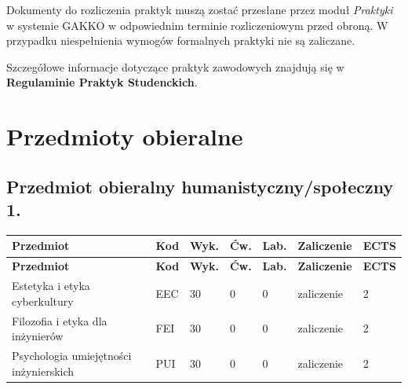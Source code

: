 \documentclass[12pt,a4paper]{article}
\newcommand{\thdrule}{\noalign{\global\setlength{\extrarowheight}{0pt}}}
\newcommand{\thdend}{\noalign{\global\setlength{\extrarowheight}{4pt}}}
\begin{document}
Dokumenty do rozliczenia praktyk muszą zostać przesłane przez moduł \textit{Praktyki} w systemie GAKKO w odpowiednim terminie rozliczeniowym przed obroną. W przypadku niespełnienia wymogów formalnych praktyki nie są zaliczane.

Szczegółowe informacje dotyczące praktyk zawodowych znajdują się w \textbf{Regulaminie Praktyk Studenckich}.

\newpage

\section{Przedmioty obieralne}


\subsection*{Przedmiot obieralny humanistyczny/społeczny 1.}

{\scriptsize
\begin{longtable}{m{5.5cm}m{0.8cm}m{1cm}m{1cm}m{1cm}m{1.7cm}m{0.7cm}}
\thdrule\toprule
\rowcolor{pjatkRed}
{\color{white}\footnotesize\textbf{\vphantom{Ag}Przedmiot}} & {\color{white}\footnotesize\textbf{\vphantom{Ag}Kod}} & {\color{white}\footnotesize\textbf{\vphantom{Ag}Wyk.}} & {\color{white}\footnotesize\textbf{\vphantom{Ag}Ćw.}} & {\color{white}\footnotesize\textbf{\vphantom{Ag}Lab.}} & {\color{white}\footnotesize\textbf{\vphantom{Ag}Zaliczenie}} & {\color{white}\footnotesize\textbf{\vphantom{Ag}ECTS}} \\
\midrule\thdend
\endfirsthead
\thdrule\toprule
\rowcolor{pjatkRed}
{\color{white}\footnotesize\textbf{\vphantom{Ag}Przedmiot}} & {\color{white}\footnotesize\textbf{\vphantom{Ag}Kod}} & {\color{white}\footnotesize\textbf{\vphantom{Ag}Wyk.}} & {\color{white}\footnotesize\textbf{\vphantom{Ag}Ćw.}} & {\color{white}\footnotesize\textbf{\vphantom{Ag}Lab.}} & {\color{white}\footnotesize\textbf{\vphantom{Ag}Zaliczenie}} & {\color{white}\footnotesize\textbf{\vphantom{Ag}ECTS}} \\
\midrule\thdend
\endhead
\rowcolor{tableRowLight} Estetyka i etyka cyberkultury & EEC & 30 & 0 & 0 & {\scriptsize zaliczenie} & 2 \\
\rowcolor{tableRowAlt} Filozofia i etyka dla inżynierów & FEI & 30 & 0 & 0 & {\scriptsize zaliczenie} & 2 \\
\rowcolor{tableRowLight} Psychologia umiejętności inżynierskich & PUI & 30 & 0 & 0 & {\scriptsize zaliczenie} & 2 \\
\bottomrule
\end{longtable}}
\end{document}
